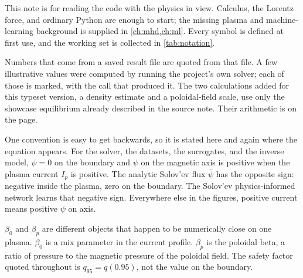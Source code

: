 \documentclass[11pt,a4paper,oneside,openany]{book}
\newcommand{\code}{\path}
\numberwithin{equation}{chapter}
\newcommand{\psibar}{\bar{\psi}}
\newcommand{\Ip}{I_{p}}
\theoremstyle{definition}
\begin{document}
This note is for reading the \code{fusion-gs} code with the physics in view. Calculus, the Lorentz force, and ordinary Python are enough to start; the missing plasma and machine-learning background is supplied in \cref{ch:mhd,ch:ml}. Every symbol is defined at first use, and the working set is collected in \cref{tab:notation}.

Numbers that come from a saved result file are quoted from that file. A few illustrative values were computed by running the project's own solver; each of those is marked, with the call that produced it. The two calculations added for this typeset version, a density estimate and a poloidal-field scale, use only the showcase equilibrium already described in the source note. Their arithmetic is on the page.

One convention is easy to get backwards, so it is stated here and again where the equation appears. For the solver, the datasets, the surrogates, and the inverse model, \(\psi=0\) on the boundary and \(\psi\) on the magnetic axis is positive when the plasma current \(\Ip\) is positive. The analytic Solov'ev flux \(\psibar\) has the opposite sign: negative inside the plasma, zero on the boundary. The Solov'ev physics-informed network learns that negative sign. Everywhere else in the figures, positive current means positive \(\psi\) on axis.

\(\beta_{0}\) and \(\beta_{p}\) are different objects that happen to be numerically close on one plasma. \(\beta_{0}\) is a mix parameter in the current profile. \(\beta_{p}\) is the poloidal beta, a ratio of pressure to the magnetic pressure of the poloidal field. The safety factor quoted throughout is \(q_{95}=q(0.95)\), not the value on the boundary.
\end{document}
